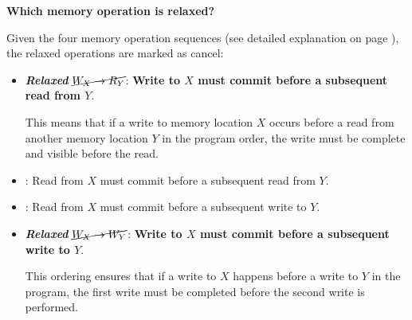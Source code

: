 \begin{flushleft}
    \textcolor{Green3}{ \textbf{Which memory operation is relaxed?}}
\end{flushleft}
Given the four memory operation sequences (see detailed explanation on page ), the relaxed operations are marked as cancel:
\begin{itemize}
    \item[\textcolor{Green3}{\faIcon{check}}] \textcolor{Green3}{\textbf{\emph{Relaxed}} $\cancel{W_{X} \rightarrow R_{Y}}$}: \textbf{Write to $X$ must commit before a subsequent read from $Y$}.

    This means that if a write to memory location $X$ occurs before a read from another memory location $Y$ in the program order, the write must be complete and visible before the read.


    \item[\textcolor{Red2}{\faIcon{times}}] : Read from $X$ must commit before a subsequent read from $Y$.
    \item[\textcolor{Red2}{\faIcon{times}}] : Read from $X$ must commit before a subsequent write to $Y$.
    \item[\textcolor{Green3}{\faIcon{check}}] \textcolor{Green3}{\textbf{\emph{Relaxed}} $\cancel{W_{X} \rightarrow W_{Y}}$}: \textbf{Write to $X$ must commit before a subsequent write to $Y$}.

    This ordering ensures that if a write to $X$ happens before a write to $Y$ in the program, the first write must be completed before the second write is performed.
\end{itemize}

